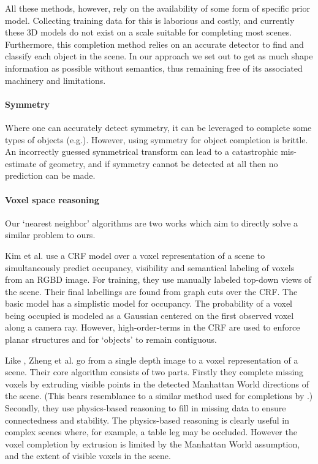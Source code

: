 \documentclass[10pt,twocolumn,letterpaper]{article}
\makeatletter
\renewcommand*{\eg}{e.g.\@\xspace}
\newcommand*{\ea}{et al.\@\xspace}
\makeatother
\begin{document}
All these methods, however, rely on the availability of some form of specific prior model.
Collecting training data for this is laborious and costly, and currently these 3D models do not exist on a scale suitable for completing most scenes.
Furthermore, this completion method relies on an accurate detector to find and classify each object in the scene.
In our approach we set out to get as much shape information as possible without semantics, thus remaining free of its associated machinery and limitations.



\paragraph{Symmetry}
Where one can accurately detect symmetry, it can be leveraged to complete some types of objects (\eg \cite{law-cviu-2010, thrun-iccv-2005, kroemer-humanoids-2012}). 
However, using symmetry for object completion is brittle.
An incorrectly guessed symmetrical transform can lead to a catastrophic mis-estimate of geometry, and if symmetry cannot be detected at all then no prediction can be made.


\paragraph{Voxel space reasoning}

Our `nearest neighbor' algorithms are two works which aim to directly solve a similar problem to ours.

Kim \ea \cite{kim-iccv-2013} use a CRF model over a voxel representation of a scene to simultaneously predict occupancy, visibility and semantical labeling of voxels from an RGBD image. 
For training, they use manually labeled top-down views of the scene.
Their final labellings are found from graph cuts over the CRF.
The basic model has a simplistic model for occupancy. 
The probability of a voxel being occupied is modeled as a Gaussian centered on the first observed voxel along a camera ray.
However, high-order-terms in the CRF are used to enforce planar structures and for `objects' to remain contiguous.

Like \cite{kim-iccv-2013},  Zheng \ea \cite{zheng-cvpr-2013} go from a single depth image to a voxel representation of a scene.
Their core algorithm consists of two parts.
Firstly they complete missing voxels by extruding visible points in the detected Manhattan World directions of the scene.
(This bears resemblance to a similar method used for completions by \cite{kroemer-humanoids-2012}.)
Secondly, they use physics-based reasoning to fill in missing data to ensure connectedness and stability.
The physics-based reasoning is clearly useful in complex scenes where, for example, a table leg may be occluded.
However the voxel completion by extrusion is limited by the Manhattan World assumption, and the extent of visible voxels in the scene.
\end{document}
